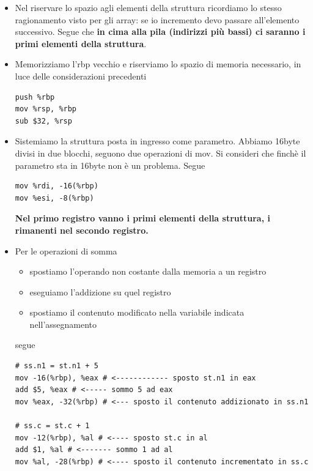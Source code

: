\documentclass[11pt]{report}
\theoremstyle{definition}
\begin{document}
\begin{itemize}
\item Nel riservare lo spazio agli elementi della struttura ricordiamo lo stesso ragionamento visto per gli array: se io incremento devo passare all'elemento successivo. Segue che \textbf{in cima alla pila (indirizzi più bassi) ci saranno i primi elementi della struttura}.

\item Memorizziamo l'rbp vecchio e riserviamo lo spazio di memoria necessario, in luce delle considerazioni precedenti
\begin{verbatim}
push %rbp
mov %rsp, %rbp
sub $32, %rsp
\end{verbatim}
\item Sistemiamo la struttura posta in ingresso come parametro. Abbiamo 16byte divisi in due blocchi, seguono due operazioni di mov. Si consideri che finchè il parametro sta in 16byte non è un problema. Segue
\begin{verbatim}
mov %rdi, -16(%rbp)
mov %esi, -8(%rbp)
\end{verbatim}
\textbf{Nel primo registro vanno i primi elementi della struttura, i rimanenti nel secondo registro.}
\item Per le operazioni di somma
\begin{itemize}
\item spostiamo l'operando non costante dalla memoria a un registro
\item eseguiamo l'addizione su quel registro
\item spostiamo il contenuto modificato nella variabile indicata nell'assegnamento
\end{itemize}
segue
\small
\begin{verbatim}
# ss.n1 = st.n1 + 5
mov -16(%rbp), %eax # <------------ sposto st.n1 in eax
add $5, %eax # <----- sommo 5 ad eax
mov %eax, -32(%rbp) # <--- sposto il contenuto addizionato in ss.n1
        
# ss.c = st.c + 1
mov -12(%rbp), %al # <---- sposto st.c in al
add $1, %al # <------- sommo 1 ad al
mov %al, -28(%rbp) # <---- sposto il contenuto incrementato in ss.c
        

\end{verbatim}
\end{itemize}
\end{document}
